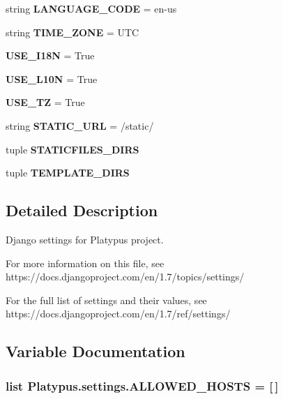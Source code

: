 \begin{DoxyCompactItemize}
string {\bf L\+A\+N\+G\+U\+A\+G\+E\+\_\+\+C\+O\+D\+E} = \textquotesingle{}en-\/us\textquotesingle{}
\item 
string {\bf T\+I\+M\+E\+\_\+\+Z\+O\+N\+E} = \textquotesingle{}U\+T\+C\textquotesingle{}
\item 
{\bf U\+S\+E\+\_\+\+I18\+N} = True
\item 
{\bf U\+S\+E\+\_\+\+L10\+N} = True
\item 
{\bf U\+S\+E\+\_\+\+T\+Z} = True
\item 
string {\bf S\+T\+A\+T\+I\+C\+\_\+\+U\+R\+L} = \textquotesingle{}/static/\textquotesingle{}
\item 
tuple {\bf S\+T\+A\+T\+I\+C\+F\+I\+L\+E\+S\+\_\+\+D\+I\+R\+S}
\item 
tuple {\bf T\+E\+M\+P\+L\+A\+T\+E\+\_\+\+D\+I\+R\+S}
\end{DoxyCompactItemize}


\subsection{Detailed Description}
\begin{DoxyVerb}Django settings for Platypus project.

For more information on this file, see
https://docs.djangoproject.com/en/1.7/topics/settings/

For the full list of settings and their values, see
https://docs.djangoproject.com/en/1.7/ref/settings/
\end{DoxyVerb}
 

\subsection{Variable Documentation}
\subsubsection[{A\+L\+L\+O\+W\+E\+D\+\_\+\+H\+O\+S\+T\+S}]{\setlength{\rightskip}{0pt plus 5cm}list Platypus.\+settings.\+A\+L\+L\+O\+W\+E\+D\+\_\+\+H\+O\+S\+T\+S = [$\,$]}\label{namespace_platypus_1_1settings_acef7d412cd11e277899731742228d304}
